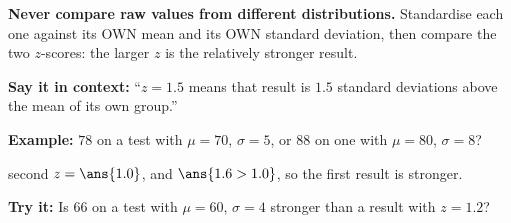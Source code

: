 \documentclass[12pt]{article}
\begin{document}

\begin{formulabox}
\textbf{Never compare raw values from different distributions.} Standardise each one against its OWN mean and its OWN standard deviation, then compare the two $z$-scores: the larger $z$ is the relatively stronger result.\par
\textbf{Say it in context:} ``$z = 1.5$ means that result is $1.5$ standard deviations above the mean of its own group.''
\end{formulabox}

\begin{examplebox}
\textbf{Example:} \quad $78$ on a test with $\mu = 70$, $\sigma = 5$, or $88$ on one with $\mu = 80$, $\sigma = 8$?

second $z = \ans{1.0}$, and $\ans{1.6 > 1.0}$, so the first result is stronger.
\end{examplebox}

\begin{tryitbox}
\textbf{Try it:} \quad Is $66$ on a test with $\mu = 60$, $\sigma = 4$ stronger than a result with $z = 1.2$?\\[2pt]
\end{tryitbox}
\end{document}
